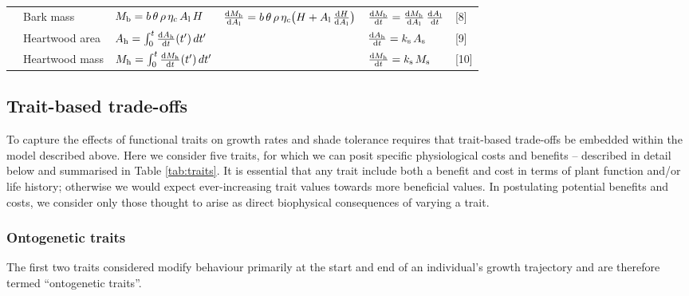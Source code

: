 \documentclass[9pt,twocolumn,twoside,lineno]{pnas-new}
\begin{document}
\begin{table*}
\begin{tabular}{p{0.1cm}p{2.5cm}p{3cm}p{4cm}p{2.5cm}p{0.75cm}}
  & Bark mass &
    $M_{\rm b} = b\, \theta \, \rho \, \eta_c \, A_{\rm l} \, H $ &
    $\frac{{\rm d}M_{\rm b}}{{\rm d}A_{\rm l}} = b \, \theta \, \rho \, \eta_c\big( H + A_{\rm l} \, \frac{{\rm d}H}{{\rm d}A_{\rm l}} \big)$ &
    $\frac{{\rm d}M_{\rm b}}{{\rm d}t}  = \frac{{\rm d}M_{\rm b}}{{\rm d}A_{\rm l}} \, \frac{{\rm d}A_{\rm l}}{{\rm d}t}$ & [8]\\
  & Heartwood area &
    $A_{\rm h} = \int_0^t \frac{{\rm d}A_{\rm h}}{{\rm d}t}(t^\prime) \, dt^\prime$ &
     &
    $\frac{{\rm d}A_{\rm h}}{{\rm d}t} = k_{\rm s} \, A_{\rm s}$ & [9] \\
  & Heartwood mass &
    $M_{\rm h} = \int_0^t \frac{{\rm d}M_{\rm h}}{{\rm d}t}(t^\prime) \, dt^\prime$ &
     &
    $\frac{{\rm d}M_{\rm h}}{{\rm d}t} = k_{\rm s} \, M_{\rm s}$ & [10]\\
  \bottomrule
\end{tabular}
\label{tab:allometry}
\end{table*}

\subsection*{Trait-based trade-offs}

To capture the effects of functional traits on growth rates and shade tolerance requires that trait-based trade-offs be embedded within the model described above. Here we consider five traits, for which we can posit specific physiological costs and benefits -- described in detail below and summarised in Table \ref{tab:traits}. It is essential that any trait include both a benefit and cost in terms of plant function and/or life history; otherwise we would expect ever-increasing trait values towards more beneficial values. In postulating potential benefits and costs, we consider only those thought to arise as direct biophysical consequences of varying a trait.

\subsubsection*{Ontogenetic traits}  The first two traits considered modify behaviour primarily at the start and end of an individual's growth trajectory and are therefore termed ``ontogenetic traits''. 
\end{document}
